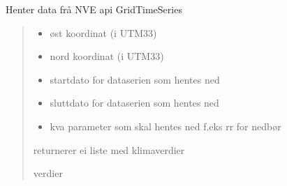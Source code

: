 \documentclass[letterpaper,10pt,norsk]{sphinxmanual}
\begin{document}
\begin{fulllineitems}
\label{\detokenize{index:klimadata.klimadata.nve_api}}
\pysigstartsignatures
{}
\pysigstopsignatures
\sphinxAtStartPar
Henter data frå NVE api GridTimeSeries
\begin{quote}\begin{description}
\begin{itemize}
\item {} 
\sphinxAtStartPar
{} \textendash{} øst koordinat (i UTM33)

\item {} 
\sphinxAtStartPar
{} \textendash{} nord koordinat (i UTM33)

\item {} 
\sphinxAtStartPar
{} \textendash{} startdato for dataserien som hentes ned

\item {} 
\sphinxAtStartPar
{} \textendash{} sluttdato for dataserien som hentes ned

\item {} 
\sphinxAtStartPar
{} \textendash{} kva parameter som skal hentes ned f.eks rr for nedbør

\end{itemize}

\sphinxAtStartPar
returnerer ei liste med klimaverdier

\sphinxAtStartPar
verdier

\end{description}\end{quote}

\end{fulllineitems}

\end{document}
